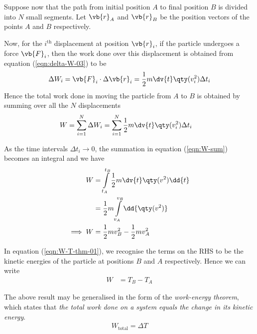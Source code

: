 		Suppose now that the path from initial position $A$ to final position $B$ is divided into $N$ small segments. Let $\vb{r}_A$ and $\vb{r}_B$ be the position vectors of the points $A$ and $B$ respectively.
		
		Now, for the $i^\text{th}$ displacement at position $\vb{r}_i$, if the particle undergoes a force $\vb{F}_i$, then the work done over this displacement is obtained from equation (\ref{eqn:delta-W-03}) to be
		\begin{align*}
			\Delta W_i=\vb{F}_i\cdot\Delta\vb{r}_i=\dfrac{1}{2}m\dv{t}\qty(v_i^2)\Delta t_i
		\end{align*}
		Hence the total work done in moving the particle from $A$ to $B$ is obtained by summing over all the $N$ displacements
		\begin{align}
			W&=\sum_{i=1}^{N}{\Delta W_i}=\sum_{i=1}^{N}{\dfrac{1}{2}m\dv{t}\qty(v_i^2)\Delta t_i} \label{eqn:W-sum}
		\end{align}
		
		As the time intervals $\Delta t_i\to 0$, the summation in equation (\ref{eqn:W-sum}) becomes an integral and we have
		\begin{align}
			W&=\int\limits_{t_A}^{t_B}{\dfrac{1}{2}m\dv{t}\qty(v^2)\dd{t}} \nonumber\\
				&=\dfrac{1}{2}m\int\limits_{v_A}^{v_B}{\dd{\qty(v^2)}} \nonumber \\
			\implies W&=\dfrac{1}{2}mv_B^2-\dfrac{1}{2}mv_A^2 \label{eqn:W-T-thm-01}
		\end{align}
		
		In equation (\ref{eqn:W-T-thm-01}), we recognise the terms on the RHS to be the kinetic energies of the particle at positions $B$ and $A$ respectively. Hence we can write
		\begin{align*}
			W&=T_B-T_A
		\end{align*}
		
		The above result may be generalised in the form of the \emph{work-energy theorem}, which states that \emph{the total work done on a system equals the change in its kinetic energy}.
		\begin{align*}
			\boxed{W_\text{total}=\Delta T}
		\end{align*}
	
